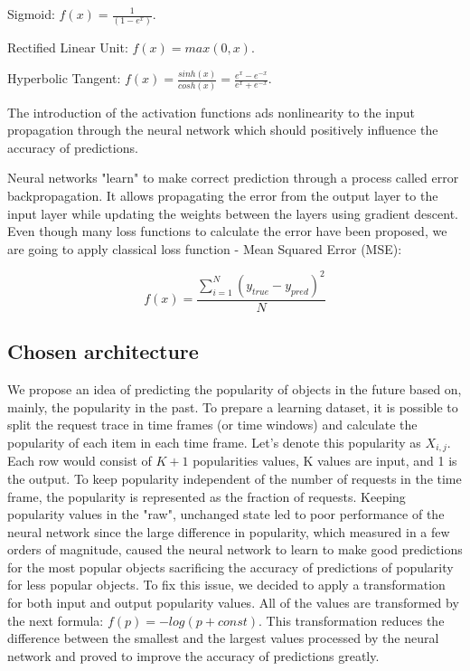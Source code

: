 \vspace{4pt}
Sigmoid: \Large $ f(x) = \frac{1}{(1 - e^x)} $.
\normalsize
\vspace{4pt}

Rectified Linear Unit: $ f(x) = max(0, x) $.

Hyperbolic Tangent: \Large $ f(x) = \frac{sinh(x)}{cosh(x)} = \frac{e^x - e^{-x}}{e^x + e^{-x}}$.

\normalsize
\vspace{4pt}
The introduction of the activation functions ads nonlinearity to the input propagation through the neural network which should positively influence the accuracy of predictions.

Neural networks "learn" to make correct prediction through a process called error backpropagation\cite{13}. It allows propagating the error from the output layer to the input layer while updating the weights between the layers using gradient descent. Even though many loss functions to calculate the error have been proposed, we are going to apply classical loss function - Mean Squared Error (MSE):

\Large
$$ f(x) = \frac{\sum_{i=1}^{N} (y_{true} - y_{pred})^2}{N} $$
\normalsize

\subsection{Chosen architecture}

We propose an idea of predicting the popularity of objects in the future based on, mainly, the popularity in the past. To prepare a learning dataset, it is possible to split the request trace in time frames (or time windows) and calculate the popularity of each item in each time frame. Let’s denote this popularity as $ X_{i,j} $. Each row would consist of $ K + 1 $ popularities values, K values are input, and 1 is the output. To keep popularity independent of the number of requests in the time frame, the popularity is represented as the fraction of requests. Keeping popularity values in the "raw", unchanged state led to poor performance of the neural network since the large difference in popularity, which measured in a few orders of magnitude, caused the neural network to learn to make good predictions for the most popular objects sacrificing the accuracy of predictions of popularity for less popular objects. To fix this issue, we decided to apply a transformation for both input and output popularity values. All of the values are transformed by the next formula: $ f(p) = -log(p + const) $. This transformation reduces the difference between the smallest and the largest values processed by the neural network and proved to improve the accuracy of predictions greatly.

